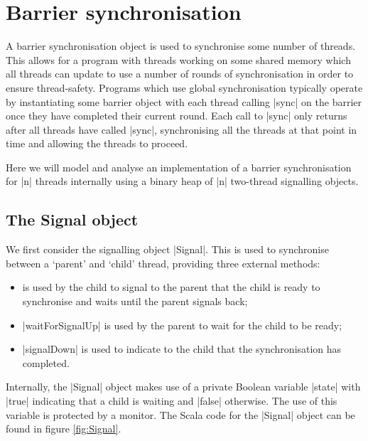 \section{Barrier synchronisation}
\inlineScala

A barrier synchronisation object is used to synchronise some number of threads. This allows for a program with threads working on some shared memory which all threads can update to use a number of rounds of synchronisation in order to ensure thread-safety. Programs which use global synchronisation typically operate by instantiating some barrier object with each thread calling |sync| on the barrier once they have completed their current round. Each call to |sync| only returns after all threads have called |sync|, synchronising all the threads at that point in time and allowing the threads to proceed\cite{CP}.

Here we will model and analyse an implementation of a barrier synchronisation for |n| threads internally using a binary heap of |n| two-thread signalling objects.

\subsection{The Signal object}

We first consider the signalling object |Signal|. This is used to synchronise between a `parent' and `child' thread, providing three external methods:


\begin{itemize}
  \item {} is used by the child to signal to the parent that the child is ready to synchronise and waits until the parent signals back;
  \item |waitForSignalUp| is used by the parent to wait for the child to be ready;
  \item |signalDown| is used to indicate to the child that the synchronisation has completed.
\end{itemize}

Internally, the |Signal| object makes use of a private Boolean variable |state| with |true| indicating that a child is waiting and |false| otherwise. The use of this variable is protected by a monitor. The Scala code for the |Signal| object can be found in figure \ref{fig:Signal}.

